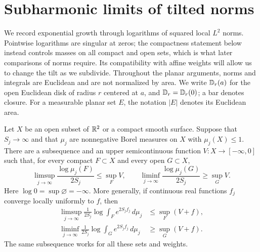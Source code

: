 \section{Subharmonic limits of tilted norms}\label{sec:profiles}

We record exponential growth through logarithms of squared local
$L^2$ norms.  Pointwise logarithms are singular at zeros; the compactness
statement below instead controls masses on all compact and open sets,
which is what later comparisons of norms require.  Its compatibility
with affine weights will allow us to change the tilt as we subdivide.
Throughout the planar arguments,
norms and integrals are Euclidean and are not normalized by area.
We write $\mathbb D_r(a)$ for the open Euclidean disk of radius $r$ centered
at $a$, and $\mathbb D_r=\mathbb D_r(0)$; a bar denotes closure. For a measurable
planar set $E$, the notation $|E|$ denotes its Euclidean area.

\begin{lemma}\label{lem:profile-extraction}
Let $X$ be an open subset of $\mathbb R^2$ or a compact smooth surface.  Suppose
that $S_j\to\infty$ and that $\mu_j$ are nonnegative Borel measures on
$X$ with $\mu_j(X)\le 1$.  There are a subsequence and an upper
semicontinuous function $V\colon X\to[-\infty,0]$ such that, for every
compact $F\subset X$ and every open $G\subset X$,
\begin{equation}\label{eq:profile-bounds}
 \limsup_{j\to\infty}\frac{\log\mu_j(F)}{2S_j}\le\sup_F V,
 \qquad
 \liminf_{j\to\infty}\frac{\log\mu_j(G)}{2S_j}\ge\sup_G V.
\end{equation}
Here $\log 0=\sup\varnothing=-\infty$.  More generally, if continuous
real functions $f_j$ converge locally uniformly to $f$, then
\[
 \begin{aligned}
 \limsup_{j\to\infty}\frac{1}{2S_j}
       \log\int_F e^{2S_j f_j}\,d\mu_j&\le\sup_F(V+f),\\
 \liminf_{j\to\infty}\frac{1}{2S_j}
       \log\int_G e^{2S_j f_j}\,d\mu_j&\ge\sup_G(V+f).
 \end{aligned}
\]
The same subsequence works for all these sets and weights.
\end{lemma}

